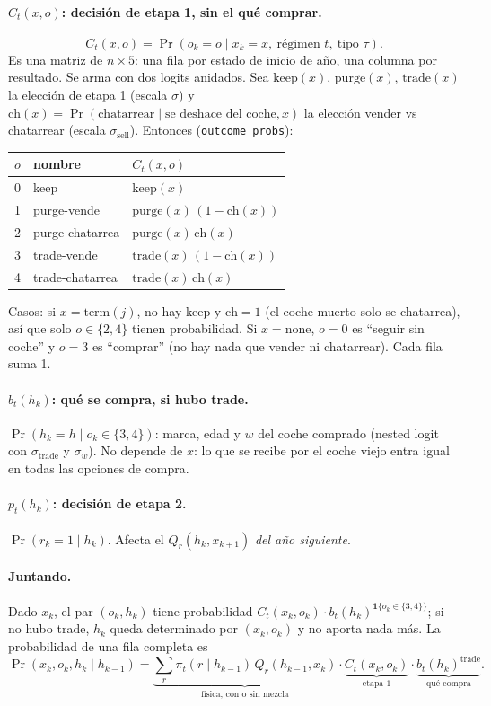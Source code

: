 \documentclass[11pt]{article}
\newcommand{\code}[1]{\texttt{\small #1}}
\newcommand{\term}{\mathrm{term}}
\newcommand{\none}{\mathrm{none}}
\newcommand{\buy}{b}
\newcommand{\1}{\mathbf{1}}
\begin{document}
\paragraph{$C_t(x,o)$: decisión de etapa 1, sin el qué comprar.}
\[
  C_t(x,o)=\Pr(o_k=o\mid x_k=x,\ \text{régimen } t,\ \text{tipo }\tau).
\]
Es una matriz de $n\times 5$: una fila por estado de inicio de año, una columna por
resultado. Se arma con dos logits anidados. Sea $\text{keep}(x)$, $\text{purge}(x)$,
$\text{trade}(x)$ la elección de etapa 1 (escala $\sigma$) y
$\text{ch}(x)=\Pr(\text{chatarrear}\mid\text{se deshace del coche},x)$ la elección vender
vs chatarrear (escala $\sigma_{\text{sell}}$). Entonces (\code{outcome\_probs}):
\begin{center}
\begin{tabular}{cll}
\toprule
$o$ & nombre & $C_t(x,o)$\\
\midrule
0 & keep & $\text{keep}(x)$\\
1 & purge-vende & $\text{purge}(x)\,(1-\text{ch}(x))$\\
2 & purge-chatarrea & $\text{purge}(x)\,\text{ch}(x)$\\
3 & trade-vende & $\text{trade}(x)\,(1-\text{ch}(x))$\\
4 & trade-chatarrea & $\text{trade}(x)\,\text{ch}(x)$\\
\bottomrule
\end{tabular}
\end{center}
Casos: si $x=\term(j)$, no hay keep y $\text{ch}=1$ (el coche muerto solo se chatarrea),
así que solo $o\in\{2,4\}$ tienen probabilidad. Si $x=\none$, $o=0$ es ``seguir sin coche''
y $o=3$ es ``comprar'' (no hay nada que vender ni chatarrear). Cada fila suma 1.

\paragraph{$\buy_t(h_k)$: qué se compra, si hubo trade.}
$\Pr(h_k=h\mid o_k\in\{3,4\})$: marca, edad y $w$ del coche comprado (nested logit con
$\sigma_{\text{trade}}$ y $\sigma_w$). No depende de $x$: lo que se recibe por el coche viejo
entra igual en todas las opciones de compra.

\paragraph{$p_t(h_k)$: decisión de etapa 2.} $\Pr(r_k=1\mid h_k)$. Afecta el
$Q_{r}(h_k,x_{k+1})$ \emph{del año siguiente}.

\paragraph{Juntando.} Dado $x_k$, el par $(o_k,h_k)$ tiene probabilidad
$C_t(x_k,o_k)\cdot\buy_t(h_k)^{\1\{o_k\in\{3,4\}\}}$; si no hubo trade, $h_k$ queda
determinado por $(x_k,o_k)$ y no aporta nada más. La probabilidad de una fila completa es
\[
  \Pr(x_k,o_k,h_k\mid h_{k-1})=
  \underbrace{\sum_{r}\pi_t(r\mid h_{k-1})\,Q_r(h_{k-1},x_k)}_{\text{física, con o sin mezcla}}
  \cdot\underbrace{C_t(x_k,o_k)}_{\text{etapa 1}}
  \cdot\underbrace{\buy_t(h_k)^{\text{trade}}}_{\text{qué compra}}.
\]
\end{document}

